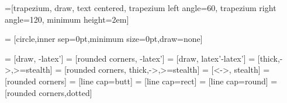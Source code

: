 

=[trapezium, draw, text centered, trapezium left angle=60, trapezium right angle=120, minimum height=2em]





 = [circle,inner sep=0pt,minimum size=0pt,draw=none]

\pgfplotsset{compat=1.18}

 = [draw, -latex']
 = [rounded corners, -latex']
 = [draw, latex'-latex']
 = [thick,->,>=stealth]
 = [rounded corners, thick,->,>=stealth]
 = [<->, stealth]
 = [rounded corners]
 = [line cap=butt]
 = [line cap=rect]
 = [line cap=round]
 = [rounded corners,dotted]
